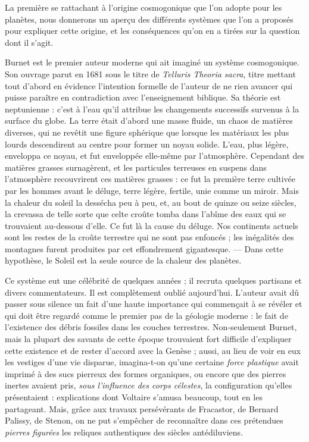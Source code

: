 \documentclass[a4paper, 11pt, oneside, landscape]{article}
\begin{document}
La première se rattachant à l'origine cosmogonique que l'on adopte pour les planètes, nous donnerons un aperçu des différents systèmes que l'on a proposés pour expliquer cette origine, et les conséquences qu'on en a tirées sur la question dont il s'agit.

Burnet est le premier auteur moderne qui ait imaginé un système cosmogonique. Son ouvrage parut en 1681 sous le titre de \emph{Telluris Theoria sacra}, titre mettant tout d'abord en évidence l'intention formelle de l'auteur de ne rien avancer qui puisse paraître en contradiction avec l'enseignement biblique. Sa théorie est neptunienne : c'est à l'eau qu'il attribue les changements successifs survenus à la surface du globe. La terre était d'abord une masse fluide, un chaos de matières diverses, qui ne revêtit une figure sphérique que lorsque les matériaux les plus lourds descendirent au centre pour former un noyau solide. L'eau, plus légère, enveloppa ce noyau, et fut enveloppée elle-même par l'atmosphère. Cependant des matières grasses surnagèrent, et les particules terreuses en suspens dans l'atmosphère recouvrirent ces matières grasses : ce fut la première terre cultivée par les hommes avant le déluge, terre légère, fertile, unie comme un miroir. Mais la chaleur du soleil la dessécha peu à peu, et, au bout de quinze ou seize siècles, la crevassa de telle sorte que celte croûte tomba dans l'abîme des eaux qui se trouvaient au-dessous d'elle. Ce fut là la cause du déluge. Nos continents actuels sont les restes de la croûte terrestre qui ne sont pas enfoncés ; les inégalités des montagnes furent produites par cet effondrement gigantesque. --- Dans cette hypothèse, le Soleil est la seule source de la chaleur des planètes.

Ce système eut une célébrité de quelques années ; il recruta quelques partisans et divers commentateurs. Il est complètement oublié aujourd'hui. L'auteur avait dû passer sous silence un fait d'une haute importance qui commençait à se révéler et qui doit être regardé comme le premier pas de la géologie moderne : le fait de l'existence des débris fossiles dans les couches terrestres. Non-seulement Burnet, mais la plupart des savants de cette époque trouvaient fort difficile d'expliquer cette existence et de rester d'accord avec la Genèse ; aussi, au lieu de voir en eux les vestiges d'une vie disparue, imagina-t-on qu'une certaine \emph{force plastique} avait imprimé à des sucs pierreux des formes organiques, ou encore que des pierres inertes avaient pris, \emph{sous l'influence des corps célestes}, la configuration qu'elles présentaient : explications dont Voltaire s'amusa beaucoup, tout en les partageant. Mais, grâce aux travaux persévérants de Fracastor, de Bernard Palissy, de Stenon, on ne put s'empêcher de reconnaître dans ces prétendues \emph{pierres figurées} les reliques authentiques des siècles antédiluviens.
\end{document}
